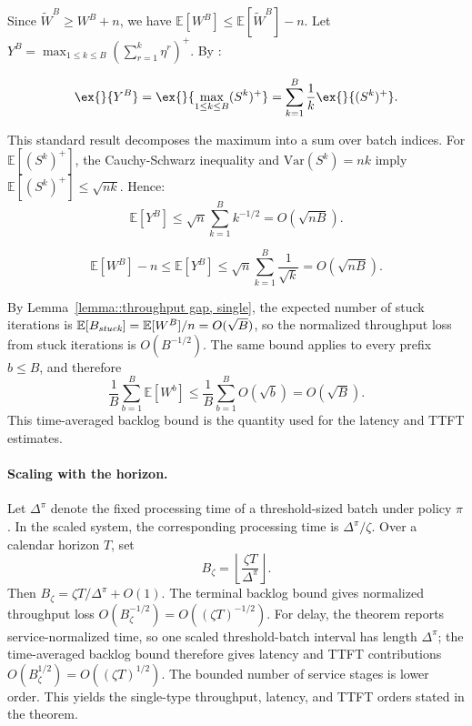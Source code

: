 Since \(\tilde{W}^B \geq W^B + n\), we have \(\mathbb{E}[W^B]\leq \mathbb{E}[\tilde{W}^B]-n\). Let \(Y^B = \max_{1\leq k\leq B}(\sum_{r=1}^{k}\eta^r)^+\). By \cite[Lemma 2]{strait1974maximum}:
\begin{lemma}\label{lem:Y_T}
$$\ex{}{Y^B}=\ex{}{\max_{1\leq k\leq B}(S^k)^+}=\sum_{k=1}^B \frac{1}{k}\ex{}{(S^k)^+}.$$
\end{lemma}
\noindent This standard result \citep{strait1974maximum} decomposes the maximum into a sum over batch indices. For \(\mathbb{E}[(S^k)^+]\), the Cauchy-Schwarz inequality and \(\mathrm{Var}(S^k)=nk\) imply \(\mathbb{E}[(S^k)^+] \leq \sqrt{nk}\). Hence:
$$\mathbb{E}[Y^B] \leq \sqrt{n} \sum_{k=1}^B k^{-1/2}=O(\sqrt{nB}).$$

\begin{lemma}\label{lemma::throughput gap}
$$\mathbb{E}[W^B]-n\leq \mathbb{E}[Y^B]\leq  \sqrt{n} \sum_{k=1}^B \frac{1}{\sqrt{k}}=O(\sqrt{nB}).$$
\end{lemma}
\noindent By Lemma~\ref{lemma::throughput gap, single}, the expected number of stuck iterations is \(\mathbb{E}[B_{\emph{stuck}}]=\mathbb{E}[W^B]/n=O(\sqrt{B})\), so the normalized throughput loss from stuck iterations is \(O(B^{-1/2})\). The same bound applies to every prefix \(b\le B\), and therefore
\[
    \frac{1}{B}\sum_{b=1}^B \mathbb{E}[W^b] \leq \frac{1}{B}\sum_{b=1}^B O(\sqrt{b}) = O(\sqrt{B}).
\]
This time-averaged backlog bound is the quantity used for the latency and TTFT estimates.

\paragraph{Scaling with the horizon.} Let \(\Delta^\pi\) denote the fixed processing time of a threshold-sized batch under policy \(\pi\). In the scaled system, the corresponding processing time is \(\Delta^\pi/\zeta\). Over a calendar horizon \(T\), set
\[
    B_\zeta=\left\lfloor \frac{\zeta T}{\Delta^\pi}\right\rfloor .
\]
Then \(B_\zeta=\zeta T/\Delta^\pi+O(1)\). The terminal backlog bound gives normalized throughput loss \(O(B_\zeta^{-1/2})=O((\zeta T)^{-1/2})\). For delay, the theorem reports service-normalized time, so one scaled threshold-batch interval has length \(\Delta^\pi\); the time-averaged backlog bound therefore gives latency and TTFT contributions \(O(B_\zeta^{1/2})=O((\zeta T)^{1/2})\). The bounded number of service stages is lower order. This yields the single-type throughput, latency, and TTFT orders stated in the theorem.


